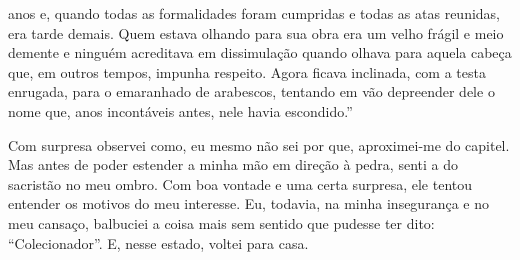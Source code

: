 anos e, quando todas as formalidades foram cumpridas e todas as atas
reunidas, era tarde demais. Quem estava olhando para sua obra era um
velho frágil e meio demente e ninguém acreditava em dissimulação quando
olhava para aquela cabeça que, em outros tempos, impunha respeito. Agora
ficava inclinada, com a testa enrugada, para o emaranhado de arabescos,
tentando em vão depreender dele o nome que, anos incontáveis antes, nele
havia escondido.''

Com surpresa observei como, eu mesmo não sei por que, aproximei-me do
capitel. Mas antes de poder estender a minha mão em direção à pedra,
senti a do sacristão no meu ombro. Com boa vontade e uma certa surpresa,
ele tentou entender os motivos do meu interesse. Eu, todavia, na minha
insegurança e no meu cansaço, balbuciei a coisa mais sem sentido que
pudesse ter dito: ``Colecionador''. E, nesse estado, voltei para casa.

